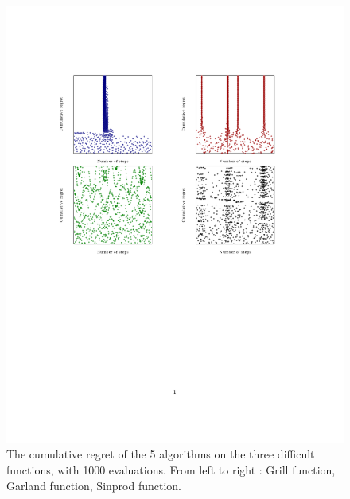 \documentclass[a4paper,10pt]{article}
\begin{document}
\begin{figure}[!ht]
\label{fig:position1000}
\hspace{-5cm}\includegraphics[trim = {0 6cm 0 4cm},clip]{marginal1000.pdf}
\vspace{-4cm}
  \caption{The cumulative regret of the 5 algorithms on the three difficult functions, with 1000 evaluations. From left to right : Grill function, Garland function, Sinprod function. }
\end{figure}

\clearpage

{}
\nocite{*}

\label{lastpage}
\end{document}
